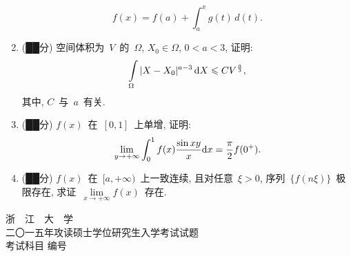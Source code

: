 \documentclass[UTF8,a4paper,11pt]{article}
\begin{document}
\begin{enumerate}
	      \[ f(x)=f(a)+\int_a^xg(t)\,d(t).\]
	      \vspace{2em}
	\item (██分) 空间体积为~$V$~的~$\Omega$, $X_0\in\Omega$, $0<a<3$, 证明:
	      \[ \int\limits_{\Omega}|X-X_0|^{a-3}\,\mathrm{d}X\leqslant CV^{\frac{a}{3}},\]
	      其中, $C$~与~$a$~有关.
	      \vspace{2em}
	\item (██分) $f(x)$~在~$[0,1]$~上单增, 证明:
	      \[\lim_{y\to+\infty}\int_0^1f(x)\dfrac{\sin{xy}}{x}\mathrm{d}x=\dfrac{\pi}{2}f(0^{+}).\]
	      \vspace{2em}
	\item (██分) $f(x)$~在~$[a,+\infty)$~上一致连续, 且对任意~$\xi>0$, 序列~$\{f(n\xi)\}$~极限存在, 求证~$\lim\limits_{x\to+\infty}f(x)$~存在.
	      \vspace{2em}
\end{enumerate}

\newpage
\setcounter{page}{1}

\begin{center}
	{\Huge 浙~~江~~大~~学}\\
	\setlength{\parskip}{5pt}
	{\Large 二〇一五年攻读硕士学位研究生入学考试试题}\\
	\setlength{\parskip}{10 pt}
	{\Large 考试科目\underline{} 编号\underline{}}
\end{center}
\end{document}
